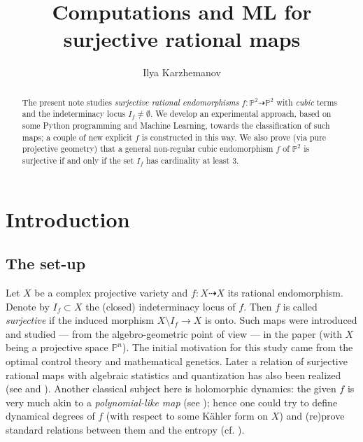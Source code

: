 \documentclass[14pt]{amsart}
\theoremstyle{definition}
\theoremstyle{remark}
\newcommand{\p}{\mathbb{P}}
\newcommand{\map}{\longrightarrow}
\begin{document}
\title{Computations and ML for surjective rational maps}

\author{Ilya Karzhemanov}

\begin{abstract}
The present note studies \emph{surjective rational endomorphisms}
$f: \mathbb{P}^2 \dashrightarrow \mathbb{P}^2$ with \emph{cubic}
terms and the indeterminacy locus $I_f \ne \emptyset$. We develop
an experimental approach, based on some Python programming and
Machine Learning, towards the classification of such maps; a
couple of new explicit $f$ is constructed in this way. We also
prove (via pure projective geometry) that a general non-regular
cubic endomorphism $f$ of $\mathbb{P}^2$ is surjective if and only
if the set $I_f$ has cardinality at least $3$.
\end{abstract}

\sloppy

\maketitle















\bigskip

\section{Introduction}
\label{section:introd}

\subsection{The set-up}
\label{subsection:introd-1}

Let $X$ be a complex projective variety and $f: X \dashrightarrow
X$ its rational endomorphism. Denote by $I_f \subset X$ the
(closed) indeterminacy locus of $f$. Then $f$ is called
\emph{surjective} if the induced morphism $X \setminus I_f \map X$
is onto. Such maps were introduced and studied --- from the
algebro-geometric point of view --- in the paper \cite{Ilya-Ilya}
(with $X$ being a projective space $\p^n$). The initial motivation
for this study came from the optimal control theory and
mathematical genetics. Later a relation of surjective rational
maps with algebraic statistics and quantization has also been
realized (see \cite{Ilya-ML} and \cite{Ilya-Quant}). Another
classical subject here is holomorphic dynamics: the given $f$ is
very much akin to a \emph{polynomial-like map} (see
\cite[Ch.\,2]{Dinh-Syb}); hence one could try to define dynamical
degrees of $f$ (with respect to some K\"ahler form on $X$) and
(re)prove standard relations between them and the entropy (cf.
\cite[Remark 1.2]{Ilya-Ilya}).
\end{document}
